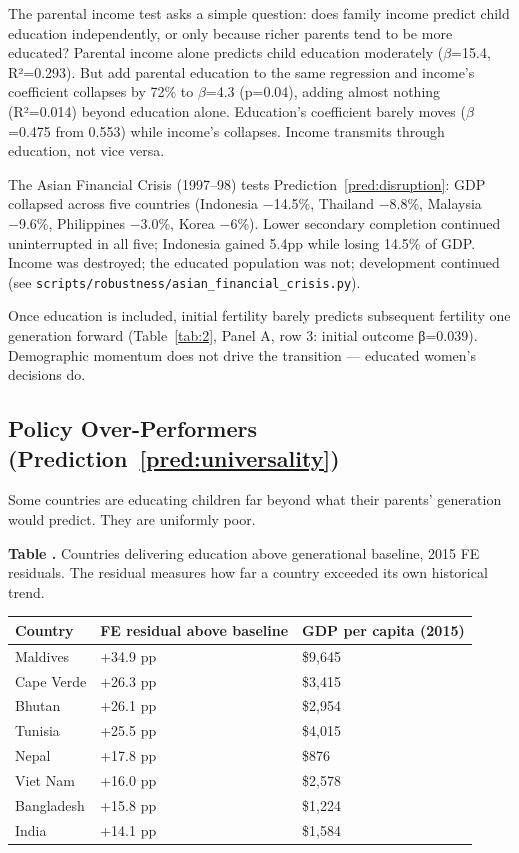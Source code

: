 \documentclass[12pt,letterpaper]{article}
\begin{document}
The parental income test asks a simple question: does family income
predict child education independently, or only because richer parents
tend to be more educated? Parental income alone predicts child education
moderately ($\beta$=15.4, R²=0.293). But add parental education to the
same regression and income's coefficient collapses by 72\% to $\beta$=4.3
(p=0.04), adding almost nothing (R²=0.014) beyond education alone.
Education's coefficient barely moves ($\beta$=0.475 from 0.553) while
income's collapses. Income transmits through education, not vice versa.

The Asian Financial Crisis (1997--98) tests Prediction~\ref{pred:disruption}: GDP collapsed across five countries (Indonesia −14.5\%,
Thailand −8.8\%, Malaysia −9.6\%, Philippines −3.0\%, Korea −6\%).
Lower secondary completion continued uninterrupted in all five;
Indonesia gained 5.4pp while losing 14.5\% of GDP. Income was destroyed; the educated population was not; development continued (see
\texttt{scripts/robustness/asian\_financial\_crisis.py}).

Once education is included, initial fertility barely predicts
subsequent fertility one generation forward (Table~\ref{tab:2}, Panel A, row 3: initial outcome β=0.039).
Demographic momentum does not drive the transition --- educated women's decisions do.

\subsection{Policy Over-Performers (Prediction~\ref{pred:universality})}\label{policy-over-performers}

Some countries are educating children far beyond what their parents' generation would predict. They are uniformly poor.

\label{tab:4}\textbf{Table \thetable.} Countries delivering education above generational
baseline, 2015 FE residuals. The residual measures how far a country
exceeded its own historical trend.

\begin{longtable}[]{@{}lll@{}}
\toprule
Country & FE residual above baseline & GDP per capita (2015) \\
\midrule
\endhead
Maldives & +34.9 pp & \$9,645 \\
Cape Verde & +26.3 pp & \$3,415 \\
Bhutan & +26.1 pp & \$2,954 \\
Tunisia & +25.5 pp & \$4,015 \\
Nepal & +17.8 pp & \$876 \\
Viet Nam & +16.0 pp & \$2,578 \\
Bangladesh & +15.8 pp & \$1,224 \\
India & +14.1 pp & \$1,584 \\
\bottomrule
\end{longtable}
\end{document}
